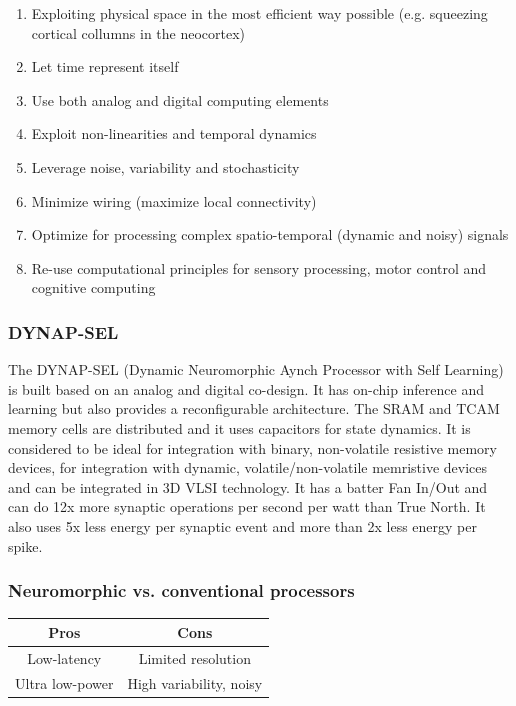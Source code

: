 \documentclass[main]{subfiles}
\begin{document}
\begin{enumerate}
    \item Exploiting physical space in the most efficient way possible (e.g. squeezing cortical collumns in the neocortex)
    \item Let time represent itself
    \item Use both analog and digital computing elements
    \item Exploit non-linearities and temporal dynamics
    \item Leverage noise, variability and stochasticity
    \item Minimize wiring (maximize local connectivity)
    \item Optimize for processing complex spatio-temporal (dynamic and noisy) signals
    \item Re-use computational principles for sensory processing, motor control and cognitive computing
\end{enumerate}

\subsubsection*{DYNAP-SEL}
The DYNAP-SEL (Dynamic Neuromorphic Aynch Processor with Self Learning) is built based on an analog and digital co-design. It has on-chip inference and learning but also provides a reconfigurable architecture. The SRAM and TCAM memory cells are distributed and it uses capacitors for state dynamics. It is considered to be ideal for integration with binary, non-volatile resistive memory devices, for integration with dynamic, volatile/non-volatile memristive devices and can be integrated in 3D VLSI technology. It has a batter Fan In/Out and can do 12x more synaptic operations per second per watt than True North. It also uses 5x less energy per synaptic event and more than 2x less energy per spike.

\subsubsection*{Neuromorphic vs. conventional processors}
\begin{table}[h]
\begin{tabular}{|c|c|}
\hline
\textbf{Pros}       & \textbf{Cons} \\ \hline
Low-latency         & Limited resolution \\ \hline
Ultra low-power     & High variability, noisy \\ \hline
\end{tabular}
\end{table}
\end{document}
